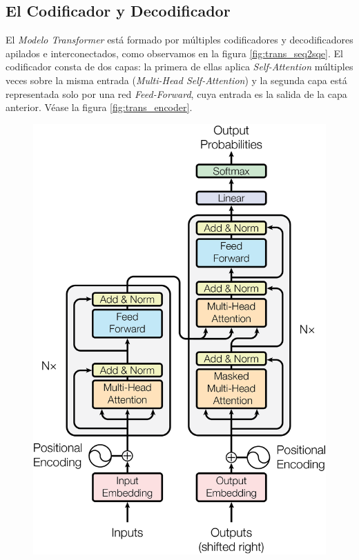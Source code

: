 \subsection{El Codificador y Decodificador}

El \textit{Modelo Transformer} está formado por múltiples codificadores y decodificadores apilados e
interconectados, como observamos en la figura \ref{fig:trans_seq2sqe}. El codificador consta de dos
capas: la primera de ellas aplica \textit{Self-Attention} múltiples veces sobre la misma entrada
(\textit{Multi-Head Self-Attention}) y la segunda capa está representada solo por una red
\textit{Feed-Forward}, cuya entrada es la salida de la capa anterior. Véase la figura \ref{fig:trans_encoder}.

\begin{figure}[ht!]
\centering
    \begin{minipage}{.4\textwidth}
        \centering
        \includegraphics[width=0.9 \textwidth]{Chapters/2. Transformer/Figures/transformer/ModalNet-21.png}

\end{minipage}
\end{figure}
